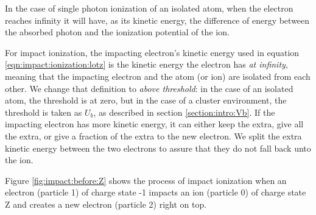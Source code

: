 In the case of single photon ionization of an isolated atom, when the electron
reaches infinity it will have, as its kinetic energy, the difference of energy
between the absorbed photon and the ionization potential of the ion.

For impact ionization, the impacting electron's kinetic energy used in equation
\eqref{eqn:impact:ionization:lotz} is the kinetic energy the electron has
\textit{at infinity}, meaning that the impacting electron and the atom (or ion)
are isolated from each other. We change that definition to \textit{above
threshold}: in the case of an isolated atom, the threshold is at zero, but in the
case of a cluster environment, the threshold is taken as $U_b$, as described in
section \ref{section:intro:Vb}. If the impacting electron has more kinetic
energy, it can either keep the extra, give all the extra, or give a fraction of
the extra to the new electron. We split the extra kinetic energy between the two
electrons to assure that they do not fall back unto the ion.


Figure \ref{fig:impact:before:Z} shows the process of impact ionization when an
electron (particle 1) of charge state -1 impacts an ion (particle 0) of charge
state Z and creates a new electron (particle 2) right on top.

